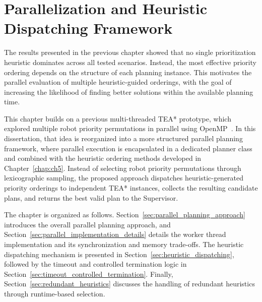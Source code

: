 \chapter{Parallelization and Heuristic Dispatching Framework} 
\label{chap:ch7}
\hspace{\parindent}
The results presented in the previous chapter showed that no single prioritization heuristic
dominates across all tested scenarios. Instead, the most effective priority ordering depends on the
structure of each planning instance. This motivates the parallel evaluation of multiple
heuristic-guided orderings, with the goal of increasing the likelihood of finding better solutions
within the available planning time.

This chapter builds on a previous multi-threaded TEA* prototype, which explored multiple robot
priority permutations in parallel using OpenMP~\cite{ribeiro2025parallel}. In this dissertation,
that idea is reorganized into a more structured parallel planning framework, where parallel
execution is encapsulated in a dedicated planner class and combined with the heuristic ordering
methods developed in Chapter~\ref{chap:ch5}. Instead of selecting robot priority permutations through lexicographic sampling, the proposed
approach dispatches heuristic-generated priority orderings to independent TEA* instances, collects
the resulting candidate plans, and returns the best valid plan to the Supervisor.

The chapter is organized as follows. Section~\ref{sec:parallel_planning_approach}
introduces the overall parallel planning approach, and
Section~\ref{sec:parallel_implementation_details} details the worker thread implementation and
its synchronization and memory trade-offs. The heuristic dispatching mechanism is presented in
Section~\ref{sec:heuristic_dispatching}, followed by the timeout and controlled termination logic in
Section~\ref{sec:timeout_controlled_termination}. Finally,
Section~\ref{sec:redundant_heuristics} discusses the handling of redundant heuristics through
runtime-based selection.


